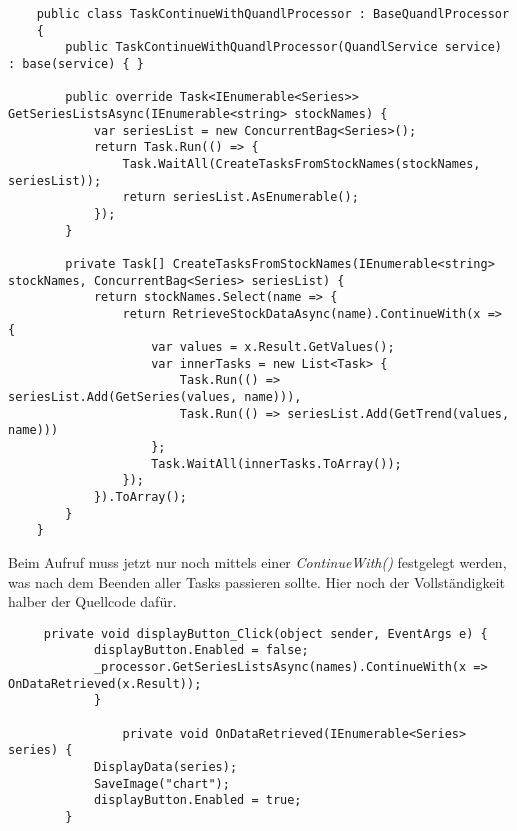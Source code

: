 \documentclass[a4paper,ngerman]{scrartcl}
\begin{document}
\begin{lstlisting}
    public class TaskContinueWithQuandlProcessor : BaseQuandlProcessor
    {
        public TaskContinueWithQuandlProcessor(QuandlService service) : base(service) { }

        public override Task<IEnumerable<Series>> GetSeriesListsAsync(IEnumerable<string> stockNames) {
            var seriesList = new ConcurrentBag<Series>();
            return Task.Run(() => {
                Task.WaitAll(CreateTasksFromStockNames(stockNames, seriesList));
                return seriesList.AsEnumerable();
            });
        }

        private Task[] CreateTasksFromStockNames(IEnumerable<string> stockNames, ConcurrentBag<Series> seriesList) {
            return stockNames.Select(name => {
                return RetrieveStockDataAsync(name).ContinueWith(x => {
                    var values = x.Result.GetValues();
                    var innerTasks = new List<Task> {
                        Task.Run(() => seriesList.Add(GetSeries(values, name))),
                        Task.Run(() => seriesList.Add(GetTrend(values, name)))
                    };
                    Task.WaitAll(innerTasks.ToArray());
                });
            }).ToArray();
        }
    }
\end{lstlisting}

Beim Aufruf muss jetzt nur noch mittels einer \textit{ContinueWith()} festgelegt werden, was nach dem Beenden aller Tasks passieren sollte. Hier noch der Vollständigkeit halber der Quellcode dafür.

\begin{lstlisting}
     private void displayButton_Click(object sender, EventArgs e) {
            displayButton.Enabled = false;
            _processor.GetSeriesListsAsync(names).ContinueWith(x => OnDataRetrieved(x.Result));
			}
		
				private void OnDataRetrieved(IEnumerable<Series> series) {
            DisplayData(series);
            SaveImage("chart");
            displayButton.Enabled = true;
        }
\end{lstlisting}
\end{document}
